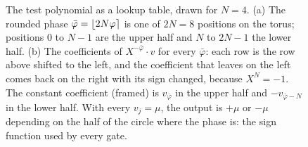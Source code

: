 \begin{figure}[!htb]
\centering

\caption{The test polynomial as a lookup table, drawn for $N=4$. (a) The
rounded phase $\bar\varphi=\left\lfloor 2N\varphi \right\rceil$ is one of $2N=8$ positions on the
torus; positions $0$ to $N-1$ are the upper half and $N$ to $2N-1$ the lower
half. (b) The coefficients of $X^{-\bar\varphi}\cdot v$ for every $\bar\varphi$:
each row is the row above shifted to the left, and the coefficient that leaves
on the left comes back on the right with its sign changed, because $X^N=-1$.
The constant coefficient (framed) is $v_{\bar\varphi}$ in the upper half and
$-v_{\bar\varphi-N}$ in the lower half. With every $v_j=\mu$, the output is $+\mu$
or $-\mu$ depending on the half of the circle where the phase is: the sign
function used by every gate.}
\label{fig:testpoly}
\end{figure}
